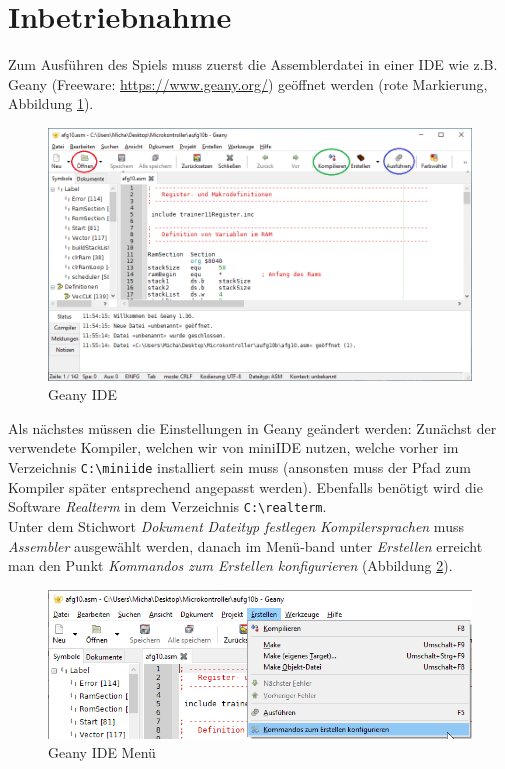 \section{Inbetriebnahme}
    Zum Ausführen des Spiels muss zuerst die Assemblerdatei in einer IDE wie z.B. Geany (Freeware: \url{https://www.geany.org/}) geöffnet werden (rote Markierung, Abbildung \ref{fig:geany}).
    \begin{figure}[H]
        \centering
        \includegraphics[scale=0.5]{img/geany.png}    
        \caption{Geany IDE}
        \label{fig:geany}
    \end{figure}
    Als nächstes müssen die Einstellungen in Geany geändert werden: 
    Zunächst der verwendete Kompiler, welchen wir von miniIDE nutzen, welche vorher im Verzeichnis \texttt{C:\textbackslash{}miniide} installiert sein muss (ansonsten muss der Pfad zum Kompiler später entsprechend angepasst werden).
    Ebenfalls benötigt wird die Software \textit{Realterm} in dem Verzeichnis \texttt{C:\textbackslash{}realterm}.
    \\
    Unter dem Stichwort \textit{Dokument} \textrightarrow{} \textit{Dateityp festlegen} \textrightarrow{} \textit{Kompilersprachen} muss \textit{Assembler} ausgewählt werden,
    danach im Menü-band unter \textit{Erstellen} erreicht man den Punkt \textit{Kommandos zum Erstellen konfigurieren} (Abbildung \ref{fig:geany-menu}).
    \begin{figure}[H]
        \centering
        \includegraphics[scale=0.5]{img/geany-menu.png}    
        \caption{Geany IDE Menü}
        \label{fig:geany-menu}
    \end{figure}
